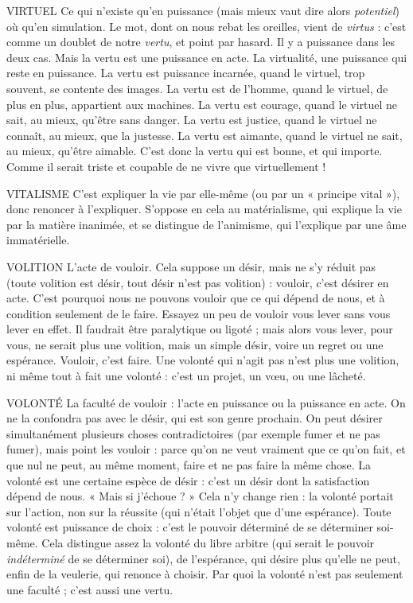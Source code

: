 VIRTUEL Ce qui n’existe qu’en puissance (mais mieux vaut dire alors {\it potentiel})
où qu’en simulation. Le mot, dont on nous rebat les oreilles,
vient de {\it virtus} : c’est comme un doublet de notre {\it vertu}, et point par hasard. Il
y a puissance dans les deux cas. Mais la vertu est une puissance en acte. La
virtualité, une puissance qui reste en puissance. La vertu est puissance incarnée,
quand le virtuel, trop souvent, se contente des images. La vertu est de l’homme,
quand le virtuel, de plus en plus, appartient aux machines. La vertu est courage,
quand le virtuel ne sait, au mieux, qu'être sans danger. La vertu est justice, quand
le virtuel ne connaît, au mieux, que la justesse. La vertu est aimante, quand le virtuel
ne sait, au mieux, qu'être aimable.
C’est donc la vertu qui est bonne, et qui importe. Comme il serait triste et
coupable de ne vivre que virtuellement !

VITALISME C'est expliquer la vie par elle-même (ou par un « principe
vital »), donc renoncer à l'expliquer. S’oppose en cela au matérialisme,
qui explique la vie par la matière inanimée, et se distingue de l’animisme,
qui l’explique par une âme immatérielle.

VOLITION L'acte de vouloir. Cela suppose un désir, mais ne s’y réduit pas
(toute volition est désir, tout désir n’est pas volition) : vouloir,
c'est désirer en acte. C’est pourquoi nous ne pouvons vouloir que ce qui
dépend de nous, et à condition seulement de le faire. Essayez un peu de vouloir
vous lever sans vous lever en effet. Il faudrait être paralytique ou ligoté ; mais
alors vous lever, pour vous, ne serait plus une volition, mais un simple désir,
voire un regret ou une espérance. Vouloir, c’est faire. Une volonté qui n’agit
pas n’est plus une volition, ni même tout à fait une volonté : c’est un projet, un
vœu, ou une lâcheté.

VOLONTÉ La faculté de vouloir : l’acte en puissance ou la puissance en
acte.
On ne la confondra pas avec le désir, qui est son genre prochain. On peut
désirer simultanément plusieurs choses contradictoires (par exemple fumer et
ne pas fumer), mais point les vouloir : parce qu’on ne veut vraiment que ce
qu’on fait, et que nul ne peut, au même moment, faire et ne pas faire la même
chose. La volonté est une certaine espèce de désir : c’est un désir dont la satisfaction
dépend de nous. « Mais si j’échoue ? » Cela n’y change rien : la volonté
portait sur l’action, non sur la réussite (qui n’était l’objet que d’une espérance).
Toute volonté est puissance de choix : c’est le pouvoir déterminé de se déterminer
soi-même. Cela distingue assez la volonté du libre arbitre (qui serait le
pouvoir {\it indéterminé} de se déterminer soi), de l’espérance, qui désire plus qu’elle
ne peut, enfin de la veulerie, qui renonce à choisir. Par quoi la volonté n’est pas
seulement une faculté ; c’est aussi une vertu.

